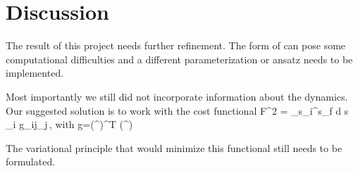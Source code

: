\documentclass[pre,preprint,groupedaddress,showpacs,showkeys]{revtex4}
\begin{document}
\section{Discussion}
\label{sec:sum}

The result of this project needs further refinement. The form of 
can pose some computational difficulties and a different parameterization or
ansatz needs to be implemented.

Most importantly we still did not incorporate information about the dynamics. Our
suggested solution is to work with the cost functional
\beq
  	F^2 = \int_{s_i}^{s_f} d s\,  _i g_{ij}_j\,,
\eeq
with
\beq
	g=\left(\JL {}^{\perp}\right)^T  \left(\JL {}^{\perp}\right)
\eeq

The variational principle that would minimize this functional still needs to be 
formulated. 







 
 
 \nocite{infdymnon,Lan:Thesis,Holmes:96}
\end{document}
